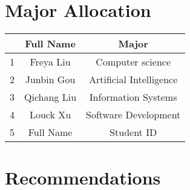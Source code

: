 \documentclass{article}
\begin{document}
	\section{Major Allocation}
	\begin{center}
		\begin{larger}
			\begin{tabular}{|c|c|c|}
				\hline &Full Name& Major\\
				\hline 1& Freya Liu & Computer science  \\
				\hline 2& Junbin Gou & Artificial Intelligence  \\
				\hline 3& Qichang Liu& Information Systems  \\
				\hline 4& Louck Xu & Software Development  \\
				\hline 5&Full Name& Student ID  \\
				\hline
			\end{tabular}
		\end{larger}
	\end{center}
	
	\section{Recommendations}
\end{document}
